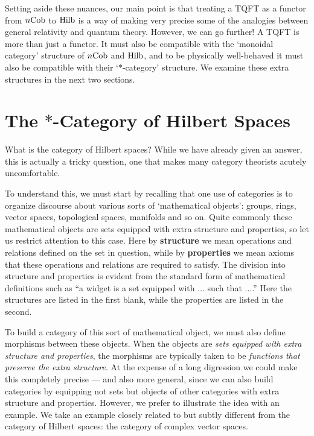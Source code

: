 \documentclass{article}
\newcommand{\Hilb}{{\rm Hilb}}
\newcommand{\Cob}{{\rm Cob}}
\begin{document}
Setting aside these nuances, our main point is that treating a TQFT as
a functor from $n\Cob$ to $\Hilb$ is a way of making very precise some
of the analogies between general relativity and quantum theory.
However, we can go further!  A TQFT is more than just a functor.  It
must also be compatible with the `monoidal category' structure of
$n\Cob$ and $\Hilb$, and to be physically well-behaved it must also be
compatible with their `$\ast$-category' structure.  We examine these
extra structures in the next two sections.

\section{The $\ast$-Category of Hilbert Spaces}  
\label{*category}

What is the category of Hilbert spaces?  While we have already given
an answer, this is actually a tricky question, one that makes many
category theorists acutely uncomfortable.  

To understand this, we must start by recalling that one use of 
categories is to organize discourse about various sorts of 
`mathematical objects': groups, rings, vector spaces, topological 
spaces, manifolds and so on.  Quite commonly these mathematical objects 
are sets equipped with extra structure and properties, so let us 
restrict attention to this case.   Here by {\bf structure} we mean 
operations and relations defined on the set in question, while by 
{\bf properties} we mean axioms that these operations and relations 
are required to satisfy.  The division into structure and properties 
is evident from the standard form of mathematical definitions such as 
``a widget is a set equipped with ... such that ....''   Here the 
structures are listed in the first blank, while the properties are 
listed in the second.    

To build a category of this sort of mathematical object, we must also 
define morphisms between these objects.  When the objects are {\it 
sets equipped with extra structure and properties}, the morphisms are 
typically taken to be {\it functions that preserve the extra structure}.
At the expense of a long digression we could make this completely 
precise --- and also more general, since we can also build categories 
by equipping not sets but objects of other categories with extra 
structure and properties.  However, we prefer to illustrate the idea 
with an example.  We take an example closely related to but subtly 
different from the category of Hilbert spaces: the category of 
complex vector spaces.  
\end{document}
